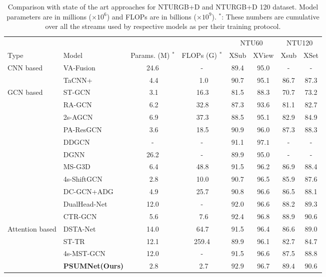 \documentclass[runningheads]{llncs}
\begin{document}
\begin{table*}[!t]
  \resizebox{\textwidth}{!} 
    {\centering
  \begin{tabular}{l|l|cc|cc|cc}
    \toprule
    & & & & \multicolumn{2}{c|}{NTU60} & \multicolumn{2}{c}{NTU120}\\
    Type & Model & Params. (M) $^*$ & FLOPs (G) $^*$ &  XSub & XView & Xsub & XSet\\
    \midrule
    \multirow{2}{4em}{CNN based} & VA-Fusion \cite{zhang2019view} & 24.6 & - & 89.4 & 95.0 & - & - \\
    & TaCNN+ \cite{xu2021topology} & $\,\,$4.4 & $\,\,\,$1.0 & 90.7 & 95.1 & 86.7 & 87.3\\
    \midrule
    \multirow{10}{4em}{GCN based} & ST-GCN \cite{stgcn2018aaai} & $\,\,$3.1 & $\,$16.3 & 81.5 & 88.3 & 70.7 & 73.2 \\
    & RA-GCN \cite{song2020richly} & $\,\,$6.2 & $\,$32.8  & 87.3 & 93.6 & 81.1 & 82.7\\
    & 2s-AGCN \cite{shi2019two} & $\,\,$6.9 & $\,$37.3 & 88.5 & 95.1 & 82.9 & 84.9\\
    & PA-ResGCN\cite{song2020stronger} & $\,\,$3.6 & $\,$18.5 & 90.9 & 96.0 & 87.3 & 88.3\\
    & DDGCN\cite{korban2020ddgcn} & - & - & 91.1 & $\mathbf{97.1}$ & - & -\\
    & DGNN \cite{shi2019skeleton} & 26.2 & - & 89.9 & 95.0 & - & - \\
    & MS-G3D\cite{liu2020disentangling} & $\,\,$6.4 & $\,$48.8 & 91.5 & 96.2 & 86.9 & 88.4\\
    & 4s-ShiftGCN\cite{cheng2020shiftgcn} & $\,\,$2.8 & $\,$10.0 & 90.7 & 96.5 & 85.9 & 87.6\\
    & DC-GCN+ADG \cite{cheng2020decoupling} & $\,\,$4.9 & $\,$25.7 & 90.8 & 96.6 & 86.5 & 88.1\\
    & DualHead-Net \cite{chen2021learning} & 12.0 & - & 92.0 & 96.6 & 88.2 & 89.3\\
    & CTR-GCN \cite{chen2021channel} & $\,\,$5.6 & $\,\,\,$7.6 & 92.4 & $96.8$ & 88.9 & 90.6\\
    \midrule
    \multirow{2}{4em}{Attention based} & DSTA-Net\cite{dstanet_accv2020} & 14.0 & $\,$64.7 & 91.5 & 96.4 & 86.6 & 89.0\\
    & ST-TR \cite{plizzari2021skeleton} & 12.1 & 259.4 & 89.9 & 96.1 & 82.7 & 84.7\\
    & 4s-MST-GCN \cite{chen2021multi} & 12.0 & - & 91.5 & 96.6 & 87.5 & 88.8\\
   
    \midrule
    & \textbf{PSUMNet(Ours)} & $\,\,2.8$ & $\,\,\,$2.7 & $\mathbf{92.9}$ & 96.7 & $\mathbf{89.4}$ & $\mathbf{90.6}$ \\
    
  \bottomrule
\end{tabular}
}
\caption{\label{tab:ntu_results}Comparison with state of the art approaches for NTURGB+D and NTURGB+D 120 dataset. Model parameters are in millions ($\times10^6$) and FLOPs are in billions ($\times10^9$). $^*$: These numbers are cumulative over all the streams used by respective models as per their training protocol.}
\end{table*}
\end{document}

